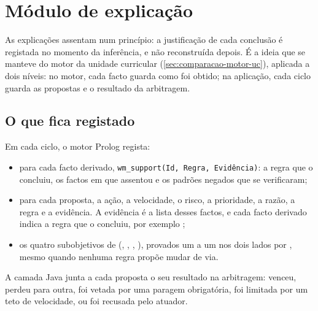 \chapter{Módulo de explicação}
\label{cap:explicacao}

As explicações assentam num princípio: a justificação de cada conclusão é
registada no momento da inferência, e não reconstruída depois. É a ideia que
se manteve do motor da unidade curricular (\cref{sec:comparacao-motor-uc}),
aplicada a dois níveis: no motor, cada facto guarda como foi obtido; na
aplicação, cada ciclo guarda as propostas e o resultado da arbitragem.

\section{O que fica registado}
\label{sec:expl-registo}

Em cada ciclo, o motor Prolog regista:

\begin{itemize}
  \item para cada facto derivado, \texttt{wm\_support(Id, Regra, Evidência)}: a
    regra que o concluiu, os factos em que assentou e os padrões negados que se
    verificaram;
  \item para cada proposta, a ação, a velocidade, o risco, a prioridade, a
    razão, a regra e a evidência. A evidência é a lista desses factos, e cada
    facto derivado indica a regra que o concluiu, por exemplo
    ;
  \item os quatro subobjetivos de 
    (, , ,
    ), provados um a um nos dois lados por
    , mesmo quando nenhuma regra propõe mudar de via.
\end{itemize}

A camada Java junta a cada proposta o seu resultado na arbitragem: venceu,
perdeu para outra, foi vetada por uma paragem obrigatória, foi limitada por um
teto de velocidade, ou foi recusada pelo atuador.


